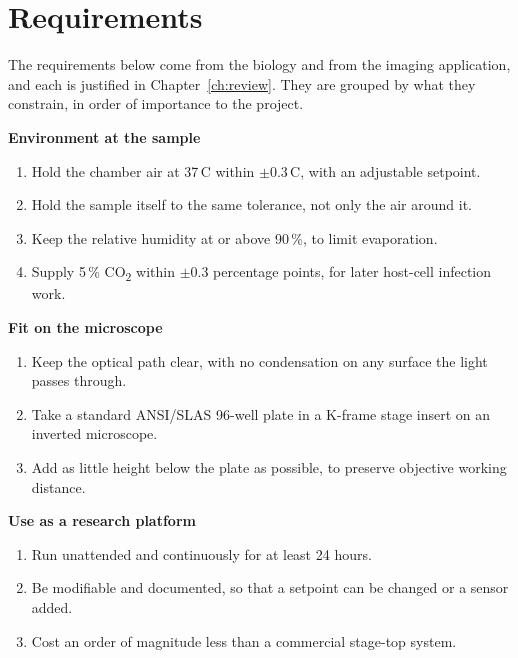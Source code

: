 \section{Requirements}
\label{sec:requirements}

The requirements below come from the biology and from the imaging application, and each is justified in Chapter~\ref{ch:review}. They are grouped by what they constrain, in order of importance to the project.

\smallskip
\noindent\textbf{Environment at the sample}\nobreak
\begin{enumerate}[label=R\arabic*., leftmargin=1.3cm, nosep]
    \item Hold the chamber air at 37\,\textdegree{}C within $\pm$0.3\,\textdegree{}C, with an adjustable setpoint.
    \item Hold the sample itself to the same tolerance, not only the air around it.
    \item Keep the relative humidity at or above 90\,\%, to limit evaporation.
    \item Supply 5\,\% CO\textsubscript{2} within $\pm$0.3 percentage points, for later host-cell infection work.
\end{enumerate}

\smallskip
\noindent\textbf{Fit on the microscope}\nobreak
\begin{enumerate}[label=R\arabic*., leftmargin=1.3cm, nosep, start=5]
    \item Keep the optical path clear, with no condensation on any surface the light passes through.
    \item Take a standard ANSI/SLAS 96-well plate \citep{ansi_slas_2004} in a K-frame stage insert on an inverted microscope.
    \item Add as little height below the plate as possible, to preserve objective working distance.
\end{enumerate}

\smallskip
\noindent\textbf{Use as a research platform}\nobreak
\begin{enumerate}[label=R\arabic*., leftmargin=1.3cm, nosep, start=8]
    \item Run unattended and continuously for at least 24 hours.
    \item Be modifiable and documented, so that a setpoint can be changed or a sensor added.
    \item Cost an order of magnitude less than a commercial stage-top system.
\end{enumerate}
\smallskip

